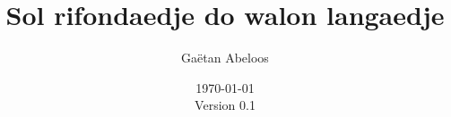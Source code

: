 \documentclass[walloon]{article}
\begin{document}
\title{Sol rifondaedje do walon langaedje}
\author{Gaëtan Abeloos}
\date{\today\\Version 0.1}

\maketitle
\end{document}
